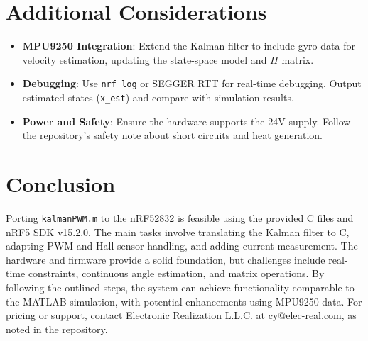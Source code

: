 \documentclass[a4paper,11pt]{article}
\begin{document}
\section{Additional Considerations}
\begin{itemize}
    \item \textbf{MPU9250 Integration}: Extend the Kalman filter to include gyro data for velocity estimation, updating the state-space model and $H$ matrix.
    \item \textbf{Debugging}: Use \texttt{nrf\_log} or SEGGER RTT for real-time debugging. Output estimated states (\texttt{x\_est}) and compare with simulation results.
    \item \textbf{Power and Safety}: Ensure the hardware supports the 24V supply. Follow the repository's safety note about short circuits and heat generation.
\end{itemize}

\section{Conclusion}
Porting \texttt{kalmanPWM.m} to the nRF52832 is feasible using the provided C files and nRF5 SDK v15.2.0. The main tasks involve translating the Kalman filter to C, adapting PWM and Hall sensor handling, and adding current measurement. The hardware and firmware provide a solid foundation, but challenges include real-time constraints, continuous angle estimation, and matrix operations. By following the outlined steps, the system can achieve functionality comparable to the MATLAB simulation, with potential enhancements using MPU9250 data. For pricing or support, contact Electronic Realization L.L.C. at \href{mailto:cy@elec-real.com}{cy@elec-real.com}, as noted in the repository.
\end{document}
